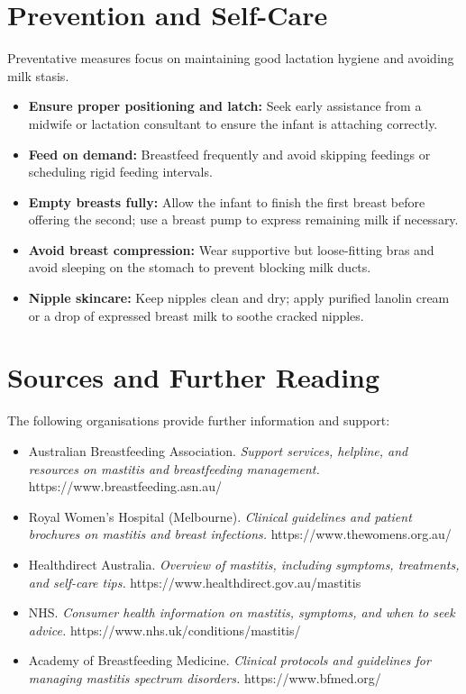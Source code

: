 \section*{Prevention and Self-Care}
Preventative measures focus on maintaining good lactation hygiene and avoiding milk stasis.
\begin{itemize}
    \item \textbf{Ensure proper positioning and latch:} Seek early assistance from a midwife or lactation consultant to ensure the infant is attaching correctly.
    \item \textbf{Feed on demand:} Breastfeed frequently and avoid skipping feedings or scheduling rigid feeding intervals.
    \item \textbf{Empty breasts fully:} Allow the infant to finish the first breast before offering the second; use a breast pump to express remaining milk if necessary.
    \item \textbf{Avoid breast compression:} Wear supportive but loose-fitting bras and avoid sleeping on the stomach to prevent blocking milk ducts.
    \item \textbf{Nipple skincare:} Keep nipples clean and dry; apply purified lanolin cream or a drop of expressed breast milk to soothe cracked nipples.
\end{itemize}

\section*{Sources and Further Reading}
The following organisations provide further information and support:
\begin{itemize}
    \item Australian Breastfeeding Association. \textit{Support services, helpline, and resources on mastitis and breastfeeding management.} https://www.breastfeeding.asn.au/
    \item Royal Women's Hospital (Melbourne). \textit{Clinical guidelines and patient brochures on mastitis and breast infections.} https://www.thewomens.org.au/
    \item Healthdirect Australia. \textit{Overview of mastitis, including symptoms, treatments, and self-care tips.} https://www.healthdirect.gov.au/mastitis
    \item NHS. \textit{Consumer health information on mastitis, symptoms, and when to seek advice.} https://www.nhs.uk/conditions/mastitis/
    \item Academy of Breastfeeding Medicine. \textit{Clinical protocols and guidelines for managing mastitis spectrum disorders.} https://www.bfmed.org/
\end{itemize}
